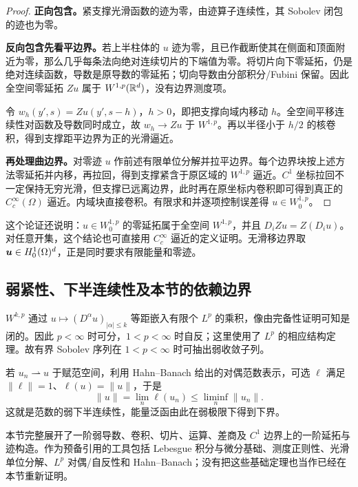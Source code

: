 \begin{proof}
\textbf{正向包含。}紧支撑光滑函数的迹为零，由迹算子连续性，其 Sobolev 闭包的迹也为零。

\textbf{反向包含先看平边界。}若上半柱体的 $u$ 迹为零，且已作截断使其在侧面和顶面附近为零，那么几乎每条法向绝对连续切片的下端值为零。将切片向下零延拓，仍是绝对连续函数，导数是原导数的零延拓；切向导数由分部积分/Fubini 保留。因此全空间零延拓 $Zu$ 属于 $W^{1,p}(\mathbb R^d)$，没有边界测度项。

令 $w_h(y',s)=Zu(y',s-h)$，$h>0$，即把支撑向域内移动 $h$。全空间平移连续性对函数及导数同时成立，故 $w_h\to Zu$ 于 $W^{1,p}$。再以半径小于 $h/2$ 的核卷积，得到支撑距平边界为正的光滑逼近。

\textbf{再处理曲边界。}对零迹 $u$ 作前述有限单位分解并拉平边界。每个边界块按上述方法零延拓并内移，再拉回，得到支撑紧含于原区域的 $W^{1,p}$ 逼近。$C^1$ 坐标拉回不一定保持无穷光滑，但支撑已远离边界，此时再在原坐标内卷积即可得到真正的 $C_c^\infty(\Omega)$ 逼近。内域块直接卷积。有限求和并逐项控制误差得 $u\in W^{1,p}_0$。
\end{proof}

这个论证还说明：$u\in W^{1,p}_0$ 的零延拓属于全空间 $W^{1,p}$，并且 $D_iZu=Z(D_i u)$。对任意开集，这个结论也可直接用 $C_c^\infty$ 逼近的定义证明。无滑移边界取 $\bm{u}\in H^1_0(\Omega)^d$，正是同时要求有限能量和零迹。

\subsection{弱紧性、下半连续性及本节的依赖边界}

$W^{k,p}$ 通过 $u\mapsto(D^\alpha u)_{|\alpha|\le k}$ 等距嵌入有限个 $L^p$ 的乘积，像由完备性证明可知是闭的。因此 $p<\infty$ 时可分，$1<p<\infty$ 时自反；这里使用了 $L^p$ 的相应结构定理。故有界 Sobolev 序列在 $1<p<\infty$ 时可抽出弱收敛子列。

若 $u_n\rightharpoonup u$ 于赋范空间，利用 Hahn--Banach 给出的对偶范数表示，可选 $\ell$ 满足 $\|\ell\|=1$、$\ell(u)=\|u\|$，于是
\[
 \|u\|=\lim_n\ell(u_n)\le\liminf_n\|u_n\|.
\]
这就是范数的弱下半连续性，能量泛函由此在弱极限下得到下界。

本节完整展开了一阶弱导数、卷积、切片、运算、差商及 $C^1$ 边界上的一阶延拓与迹构造。作为预备引用的工具包括 Lebesgue 积分与微分基础、测度正则性、光滑单位分解、$L^p$ 对偶/自反性和 Hahn--Banach；没有把这些基础定理也当作已经在本节重新证明。
